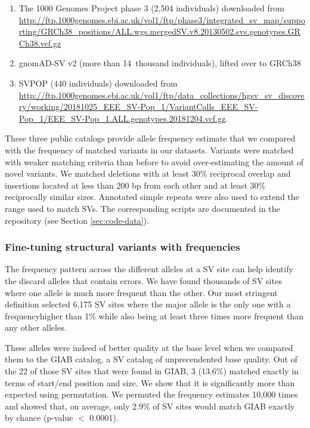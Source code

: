 \documentclass[11pt]{ucscthesis}
\begin{document}
\begin{enumerate}
\item The 1000 Genomes Project phase 3\cite{1000gp_sv_2015} (2,504 individuals) downloaded from \url{http://ftp.1000genomes.ebi.ac.uk/vol1/ftp/phase3/integrated_sv_map/supporting/GRCh38_positions/ALL.wgs.mergedSV.v8.20130502.svs.genotypes.GRCh38.vcf.gz}
\item gnomAD-SV\cite{gnomadsv_2020} v2 (more than 14~thousand individuals), lifted over to GRCh38
\item SVPOP\cite{audano2019c} (440 individuals) downloaded from \url{http://ftp.1000genomes.ebi.ac.uk/vol1/ftp/data_collections/hgsv_sv_discovery/working/20181025_EEE_SV-Pop_1/VariantCalls_EEE_SV-Pop_1/EEE_SV-Pop_1.ALL.genotypes.20181204.vcf.gz}.
\end{enumerate}

These three public catalogs provide allele frequency estimate that we compared with the frequency of matched variants in our datasets.
Variants were matched with weaker matching criteria than before to avoid over-estimating the amount of novel variants.
We matched deletions with at least 30\% reciprocal overlap and insertions located at less than 200 bp from each other and at least 30\% reciprocally similar sizes.
Annotated simple repeats were also used to extend the range used to match SVs.
The corresponding scripts are documented in the repository (see Section \ref{sec:code-data}).

\subsubsection{Fine-tuning structural variants with frequencies}
\label{subsec:svfinetuning}

The frequency pattern across the different alleles at a SV site can help identify the discard alleles that contain errors.
We have found thousands of SV sites where one allele is much more frequent than the other.
Our most stringent definition selected 6,175 SV sites where the major allele is the only one with a frequencyhigher than 1\% while also being at least three times more frequent than any other alleles.

These alleles were indeed of better quality at the base level when we compared them to the GIAB catalog\cite{zook_robust_2020}, a SV catalog of unprecendented base quality.
Out of the 22 of those SV sites that were found in GIAB, 3 (13.6\%) matched exactly in terms of start/end position and size.
We show that it is significantly more than expected using permutation.
We permuted the frequency estimates 10,000 times and showed that, on average, only 2.9\% of SV sites would match GIAB exactly by chance (p-value $<$ 0.0001).
\end{document}
